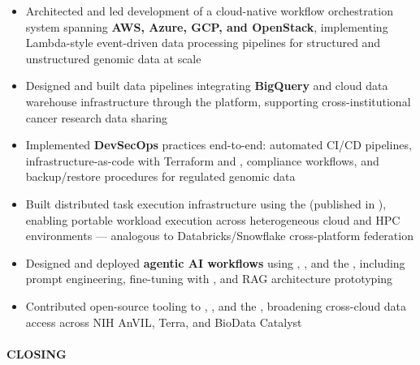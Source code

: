 \begin{itemize}

\item Architected and led development of a cloud-native workflow orchestration system spanning \textbf{AWS, Azure, GCP, and OpenStack}, implementing Lambda-style event-driven data processing pipelines for structured and unstructured genomic data at scale

\item Designed and built data pipelines integrating \textbf{BigQuery} and cloud data warehouse infrastructure through the  platform, supporting cross-institutional cancer research data sharing

\item Implemented \textbf{DevSecOps} practices end-to-end: automated CI/CD pipelines, infrastructure-as-code with Terraform and , compliance workflows, and backup/restore procedures for regulated genomic data

\item Built distributed task execution infrastructure using the  (published in ), enabling portable workload execution across heterogeneous cloud and HPC environments --- analogous to Databricks/Snowflake cross-platform federation

\item Designed and deployed \textbf{agentic AI workflows} using , , and the , including prompt engineering, fine-tuning with , and RAG architecture prototyping

\item Contributed open-source tooling to , , and the , broadening cross-cloud data access across NIH AnVIL, Terra, and BioData Catalyst

\end{itemize}

\paragraph{CLOSING}\

